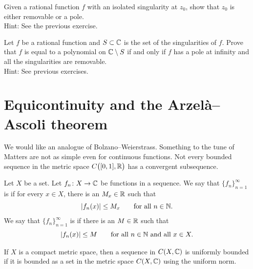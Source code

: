 \begin{exercise}
Given a rational function $f$ with an isolated singularity at $z_0$,
show that $z_0$ is either removable or a pole.
\\
Hint: See the previous exercise.
\end{exercise}

\begin{exercise}
Let $f$ be a rational function and $S \subset {\mathbb{C}}$ is the 
set of the singularities of $f$.
Prove that $f$ is equal to a polynomial on ${\mathbb{C}} \setminus S$
if and only if
$f$ has a pole at infinity and all the singularities are removable.
\\
Hint: See previous exercises.
\end{exercise}




\sectionnewpage
\section{Equicontinuity and the Arzel\`a--Ascoli theorem}
\label{sec:arzelaascoli}


We would like an analogue of Bolzano--Weierstrass.  Something to the tune of
Matters are not
as simple even for continuous functions. 
Not every bounded sequence in the metric space $C\bigl([0,1],{\mathbb{R}}\bigr)$ has
a convergent subsequence.

\begin{defn}
Let $X$ be a set.
Let $f_n \colon X \to {\mathbb{C}}$ be functions in a sequence.  We say that
$\{ f_n \}_{n=1}^\infty$
is \emph{} if for every $x \in X$, there is an $M_x \in {\mathbb{R}}$
such that
\begin{equation*}
\lvert {f_n(x)} \rvert \leq M_x \qquad \text{for all } n \in {\mathbb{N}} .
\end{equation*}
We say that
$\{ f_n \}_{n=1}^\infty$
is \emph{} if there is an $M \in {\mathbb{R}}$
such that
\begin{equation*}
\lvert {f_n(x)} \rvert \leq M \qquad \text{for all } n \in {\mathbb{N}} \text{ and all } x \in X.
\end{equation*}
\end{defn}

If $X$ is a compact metric space, then a sequence in $C(X,{\mathbb{C}})$
is uniformly bounded if it is bounded as a set in the metric space
$C(X,{\mathbb{C}})$ using the uniform norm.

